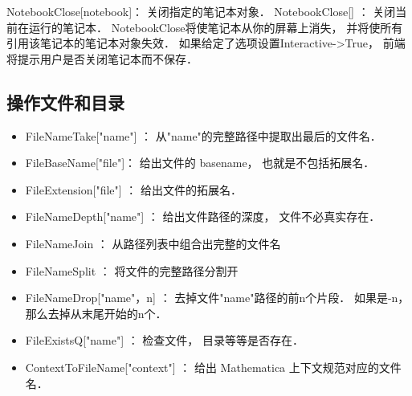 NotebookClose[notebook]： 关闭指定的笔记本对象．
NotebookClose[] ： 关闭当前在运行的笔记本．
    NotebookClose将使笔记本从你的屏幕上消失， 并将使所有引用该笔记本的笔记本对象失效．
    如果给定了选项设置Interactive->True， 前端将提示用户是否关闭笔记本而不保存．

\subsection{操作文件和目录}



\begin{itemize}
\item FileNameTake["name"] ： 从"name"的完整路径中提取出最后的文件名．
\item FileBaseName["file"]： 给出文件的 basename， 也就是不包括拓展名．
\item FileExtension["file"]  ： 给出文件的拓展名．
\item FileNameDepth["name"] ： 给出文件路径的深度， 文件不必真实存在．
\end{itemize}



\begin{itemize}
\item FileNameJoin ： 从路径列表中组合出完整的文件名
\item FileNameSplit ： 将文件的完整路径分割开
\item FileNameDrop["name"，n] ： 去掉文件"name"路径的前n个片段． 如果是-n， 那么去掉从末尾开始的n个．
\item FileExistsQ["name"]  ： 检查文件， 目录等等是否存在．
\item ContextToFileName["context"]  ： 给出 Mathematica 上下文规范对应的文件名．
\end{itemize}



